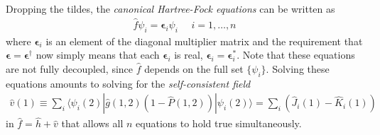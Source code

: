 \documentclass[11pt]{article}
\newcommand{\y}{\ensuremath{\psi}}
\newcommand{\eps}{\ensuremath{\bm\epsilon}}
\newcommand{\dg}{\ensuremath{^\dagger}}
\newcommand{\op}[1]{\ensuremath{ \hat{#1} } }
\newcommand{\ld}{\ensuremath{\ldots}}
\renewcommand{\sp}{\ensuremath{\ \ \ \ \ \ }}
\newcommand{\ip}[1]{\ensuremath{\langle #1\rangle}}
\theoremstyle{indented}
\begin{document}
Dropping the tildes, the {\it canonical Hartree-Fock equations} can be written as
\begin{align*}
	\op{f}\y_i
=
	\eps_i\y_i
\sp
	i=1,\ld,n
\end{align*}
where $\eps_i$ is an element of the diagonal multiplier matrix and the requirement that $\eps=\eps\dg$ now simply means that each $\eps_i$ is real, $\eps_i=\eps_i^*$.
Note that these equations are not fully decoupled, since $\op{f}$ depends on the full set $\{\y_i\}$.
Solving these equations amounts to solving for the {\it self-consistent field} 
\begin{align}
	\op{v}(1)
\equiv
\sum_i
	\ip{\y_i(2)|\op{g}(1,2)(1-\op{P}(1,2))|\y_i(2)}
=
\sum_i
	(\op{J}_i(1)-\op{K}_i(1))
\end{align}
in $\op{f}=\op{h}+\op{v}$ that allows all $n$ equations to hold true simultaneously.


\newpage
\end{document}
